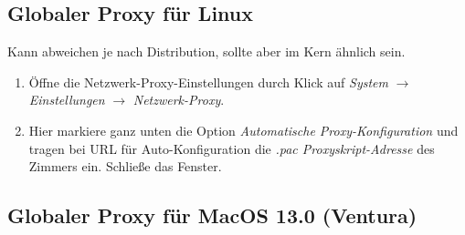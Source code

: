 \documentclass[a4paper,12pt]{scrartcl}
\begin{document}
\subsection*{Globaler Proxy für Linux}

Kann abweichen je nach Distribution, sollte aber im Kern ähnlich sein.
\begin{enumerate}
	\item Öffne die Netzwerk-Proxy-Einstellungen durch Klick auf \textit{System} $\rightarrow$ \textit{Einstellungen} $\rightarrow$ \textit{Netzwerk-Proxy}.
	\item Hier markiere ganz unten die Option \textit{Automatische Proxy-Konfiguration} und tragen bei URL für Auto-Konfiguration die \textit{.pac Proxyskript-Adresse} des Zimmers ein. Schließe das Fenster. 
\end{enumerate}

\subsection*{Globaler Proxy für MacOS 13.0 (Ventura)}
\end{document}
